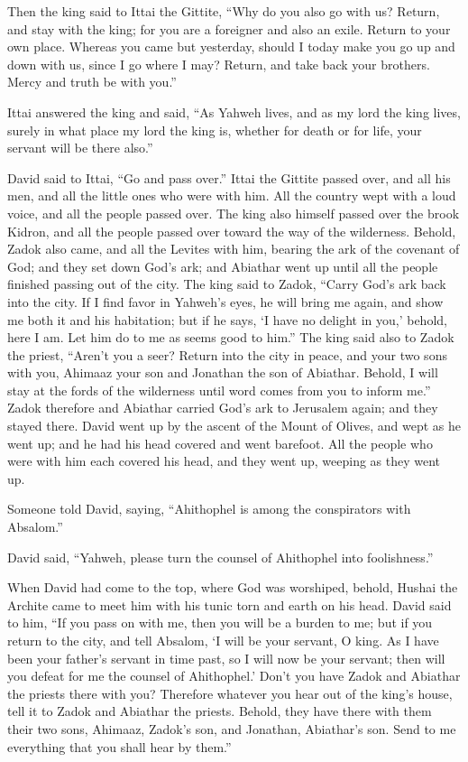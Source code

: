  Then the king said to Ittai the Gittite, ``Why do you
also go with us? Return, and stay with the king; for you are a foreigner
and also an exile. Return to your own place.  Whereas you
came but yesterday, should I today make you go up and down with us,
since I go where I may? Return, and take back your brothers. Mercy and
truth be with you.''

 Ittai answered the king and said, ``As Yahweh lives, and
as my lord the king lives, surely in what place my lord the king is,
whether for death or for life, your servant will be there also.''

 David said to Ittai, ``Go and pass over.'' Ittai the
Gittite passed over, and all his men, and all the little ones who were
with him.  All the country wept with a loud voice, and
all the people passed over. The king also himself passed over the brook
Kidron, and all the people passed over toward the way of the wilderness.
 Behold, Zadok also came, and all the Levites with him,
bearing the ark of the covenant of God; and they set down God's ark; and
Abiathar went up until all the people finished passing out of the city.
 The king said to Zadok, ``Carry God's ark back into the
city. If I find favor in Yahweh's eyes, he will bring me again, and show
me both it and his habitation;  but if he says, `I have
no delight in you,' behold, here I am. Let him do to me as seems good to
him.''  The king said also to Zadok the priest, ``Aren't
you a seer? Return into the city in peace, and your two sons with you,
Ahimaaz your son and Jonathan the son of Abiathar. 
Behold, I will stay at the fords of the wilderness until word comes from
you to inform me.''  Zadok therefore and Abiathar carried
God's ark to Jerusalem again; and they stayed there. 
David went up by the ascent of the Mount of Olives, and wept as he went
up; and he had his head covered and went barefoot. All the people who
were with him each covered his head, and they went up, weeping as they
went up.

 Someone told David, saying, ``Ahithophel is among the
conspirators with Absalom.''

David said, ``Yahweh, please turn the counsel of Ahithophel into
foolishness.''

 When David had come to the top, where God was worshiped,
behold, Hushai the Archite came to meet him with his tunic torn and
earth on his head.  David said to him, ``If you pass on
with me, then you will be a burden to me;  but if you
return to the city, and tell Absalom, `I will be your servant, O king.
As I have been your father's servant in time past, so I will now be your
servant; then will you defeat for me the counsel of Ahithophel.'
 Don't you have Zadok and Abiathar the priests there with
you? Therefore whatever you hear out of the king's house, tell it to
Zadok and Abiathar the priests.  Behold, they have there
with them their two sons, Ahimaaz, Zadok's son, and Jonathan, Abiathar's
son. Send to me everything that you shall hear by them.''


